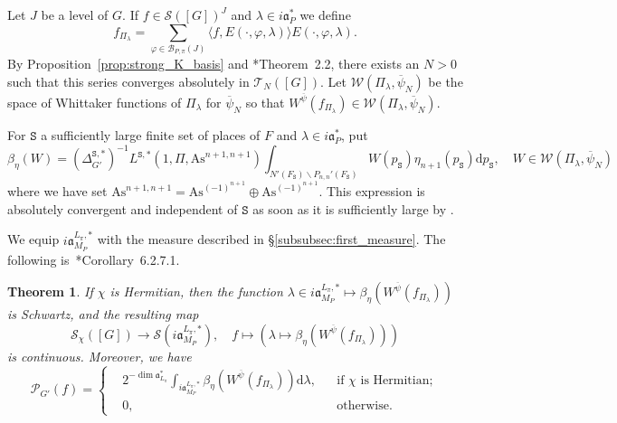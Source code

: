 \documentclass[letterpaper,11pt]{amsart}
\newcommand{\cB}{\mathcal{B}}
\newcommand{\cP}{\mathcal{P}}
\newcommand{\cS}{\mathcal{S}}
\newcommand{\rd}{\mathrm{d}}
\newcommand{\tS}{\mathtt{S}}
\newcommand{\<}{\negthickspace}
\theoremstyle{definition}
\theoremstyle{plain}
\newtheorem{theorem}[definition]{Theorem}
\theoremstyle{remark}
\numberwithin{equation}{section}
\begin{document}
Let $J$ be a level of $G$. If $f \in \cS([G])^J$ and $\lambda \in i \mathfrak{a}_P^*$ we define 
    \begin{equation}    \label{eq:sumEisenstein}
    f_{\Pi_\lambda} = \sum_{\varphi \in \cB_{P,\pi}(J)}
    \langle f, E(\cdot,\varphi,\lambda) \rangle
    E(\cdot, \varphi, \lambda).
    \end{equation}
By Proposition~\ref{prop:strong_K_basis} and \cite{Lap}*{Theorem~2.2}, there exists an $N>0$ such that this series converges absolutely in $\mathcal{T}_N([G])$. Let $\mathcal{W}(\Pi_\lambda,\overline{\psi}_N)$ 
be the space of Whittaker functions of $\Pi_\lambda$ for $\overline{\psi}_N$ so that $W^{\overline{\psi}}(f_{\Pi_\lambda}) \in \mathcal{W}(\Pi_\lambda,\overline{\psi}_N)$.  


For $\tS$ a sufficiently large finite set of places of
$F$ and $\lambda \in i \mathfrak{a}_P^*$, put
    \begin{equation}    \label{eq:defi_beta}
    \beta_{\eta}(W)  = (\Delta_{G'}^{\tS,*})^{-1}L^{\tS,*}(1,\Pi,\mathrm{As}^{n+1,n+1})
    \int_{N'(F_\tS) \backslash P_{n,n}'(F_\tS) }W(p_\tS) \eta_{n+1}(p_\tS) \rd p_\tS, \quad
    W \in \mathcal{W}(\Pi_\lambda, \overline{\psi}_N)
    \end{equation}
where we have set $\mathrm{As}^{n+1,n+1}=\mathrm{As}^{(-1)^{n+1}} \oplus \mathrm{As}^{(-1)^{n+1}}$. This
expression is absolutely convergent and independent of $\tS$ as soon as it is
sufficiently large by \cite{Fli}. 

We equip $i \mathfrak{a}_{M_P}^{L_\pi,*}$ with the measure
described in \S\ref{subsubsec:first_measure}. The following is~\cite{BPC22}*{Corollary~6.2.7.1}.


\begin{theorem}    \label{thm:FR_expansion}
If $\chi$ is Hermitian, then the
function $\lambda \in i \mathfrak{a}_{M_P}^{L_\pi, *} \mapsto
\beta_\eta(W^{\overline{\psi}}(f_{\Pi_\lambda}))$ is Schwartz, and the resulting map
    \[
    \cS_{\chi}([G]) \to \cS(i \mathfrak{a}_{M_P}^{L_\pi, *}), \quad
    f \mapsto \left( \lambda \mapsto \beta_{\eta}(W^{\overline{\psi}}(f_{\Pi_\lambda})) \right)
    \]
is continuous. Moreover, we have
    \begin{equation*}
    \cP_{G'}(f)= \left\{ \begin{aligned}
    & 2^{-\dim \mathfrak{a}_{L_\pi}^*} \int_{i \mathfrak{a}_{M_P}^{L_\pi, *}}
    \beta_{\eta}(W^{\overline{\psi}}(f_{\Pi_\lambda})) \rd \lambda,
    && \text{if $\chi$ is Hermitian}; \\
    &0, && \text{otherwise.}
    \end{aligned}\right.
    \end{equation*}
\end{theorem}
\end{document}

